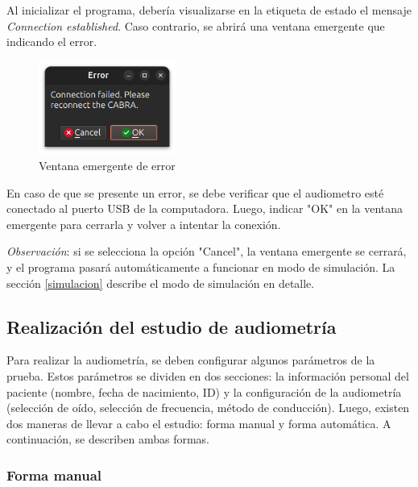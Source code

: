 Al inicializar el programa, debería visualizarse en la etiqueta de estado el mensaje \textit{Connection established}.
Caso contrario, se abrirá una ventana emergente que indicando el error.

\begin{figure}[H]
    \centering
    \includegraphics[width=0.4\textwidth]{figuras/connection_error_popup}
    \caption{Ventana emergente de error}
    \label{fig:GUI_conn_error}
\end{figure}

En caso de que se presente un error, se debe verificar que el audiometro esté conectado al puerto USB de la computadora.
Luego, indicar "OK" en la ventana emergente para cerrarla y volver a intentar la conexión.

\textit{Observación}: si se selecciona la opción "Cancel", la ventana emergente se cerrará, y el programa pasará
automáticamente a funcionar en modo de simulación.
La sección \ref{simulacion} describe el modo de simulación en detalle.

\subsection{Realización del estudio de audiometría}

Para realizar la audiometría, se deben configurar algunos parámetros de la prueba.
Estos parámetros se dividen en dos secciones: la información personal del paciente (nombre, fecha de nacimiento,
ID) y la configuración de la audiometría (selección de oído, selección de frecuencia, método de conducción).
Luego, existen dos maneras de llevar a cabo el estudio: forma manual y forma automática.
A continuación, se describen ambas formas.

\subsubsection{Forma manual} \label{manual}

